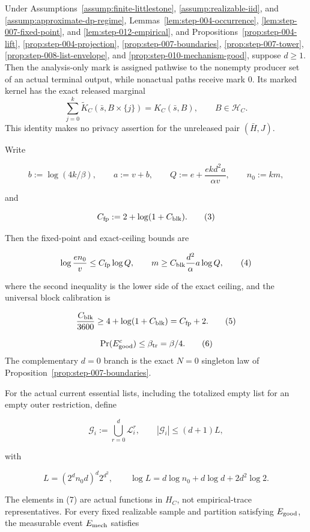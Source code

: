 \begin{proposition}
\label{prop:step-013-interfaces}
Under Assumptions~\ref{assump:finite-littlestone},
\ref{assump:realizable-iid}, and
\ref{assump:approximate-dp-regime},
Lemmas~\ref{lem:step-004-occurrence},
\ref{lem:step-007-fixed-point}, and
\ref{lem:step-012-empirical}, and
Propositions~\ref{prop:step-004-lift},
\ref{prop:step-004-projection},
\ref{prop:step-007-boundaries},
\ref{prop:step-007-tower},
\ref{prop:step-008-list-envelope}, and
\ref{prop:step-010-mechanism-good}, suppose \(d\ge1\). Then the
analysis-only mark is assigned pathwise to the nonempty producer set of
an actual terminal output, while nonactual paths receive mark \(0\). Its
marked kernel has the exact released marginal
\[
\sum_{j=0}^k\widetilde K_C(\bar s,B\times\{j\})
=K_C(\bar s,B),
\qquad B\in\mathcal H_C.
\tag{1}
\]
This identity makes no privacy assertion for the unreleased pair
\((\bar H,J)\).

Write

\[
 b:=\log(4k/\beta),\qquad a:=v+b,
 \qquad Q:=e+\frac{ekd^2a}{\alpha v},
 \qquad n_0:=km,
 \tag{2}
\]

and

\[
 C_{\rm fp}:=2+\log(1+C_{\rm blk}).
 \tag{3}
\]

Then the fixed-point and exact-ceiling bounds are

\[
 \log\frac{en_0}{v}\leq C_{\rm fp}\log Q,
 \qquad
 m\geq C_{\rm blk}\frac{d^2}{\alpha}a\log Q,
 \tag{4}
\]

where the second inequality is the lower side of the exact ceiling, and the
universal block calibration is

\[
 \frac{C_{\rm blk}}{3600}
 \geq4+\log(1+C_{\rm blk})=C_{\rm fp}+2.
 \tag{5}
\]

\[
 \Pr(E_{\rm good}^c)\leq\beta_{\rm tr}=\beta/4.
 \tag{6}
\]
The complementary \(d=0\) branch is the exact \(N=0\) singleton law of
Proposition~\ref{prop:step-007-boundaries}.

For the actual current essential lists, including the totalized empty list
for an empty outer restriction, define

\[
 \mathcal G_i:=\bigcup_{r=0}^d\mathcal L_i^r,
 \qquad
 |\mathcal G_i|\leq(d+1)L,
 \tag{7}
\]

with

\[
 L=(2^dn_0d)^d2^{d^2},
 \qquad
 \log L=d\log n_0+d\log d+2d^2\log2.
 \tag{8}
\]

The elements in (7) are actual functions in \(H_C\), not empirical-trace
representatives. For every fixed realizable sample and partition satisfying
\(E_{\rm good}\), the measurable event \(E_{\rm mech}\) satisfies


\end{proposition}
